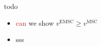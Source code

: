 \begin{frame}{todo}
  \begin{itemize}
    \item \textcolor{red}{can} we show \(v^{\mathrm{EMSC}} \ge v^{\mathrm{MSC}}\)
    \item sss
  \end{itemize}
\end{frame}
\begin{frame}

  \printbibliography
\end{frame}

